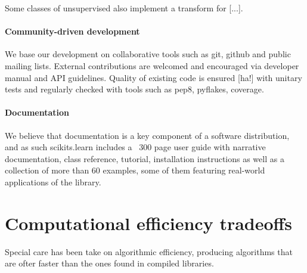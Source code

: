 \documentclass[twoside,11pt]{article}
\begin{document}
Some classes of unsupervised also implement a transform for [...].




\paragraph{Community-driven development}

We base our development on collaborative tools such as git, github and
public mailing lists. External contributions are welcomed and
encouraged via developer manual and API guidelines. Quality of
existing code is ensured [ha!] with unitary tests and regularly
checked with tools such as pep8, pyflakes, coverage.




\paragraph{Documentation}

We believe that documentation is a key component of a software
distribution, and as such scikits.learn includes a ~300 page user
guide with narrative documentation, class reference, tutorial,
installation instructions as well as a collection of more than 60
examples, some of them featuring real-world applications of the
library.


\section{Computational efficiency tradeoffs}


Special care has been take on algorithmic efficiency, producing
algorithms that are ofter faster than the ones found in compiled
libraries.
\end{document}
